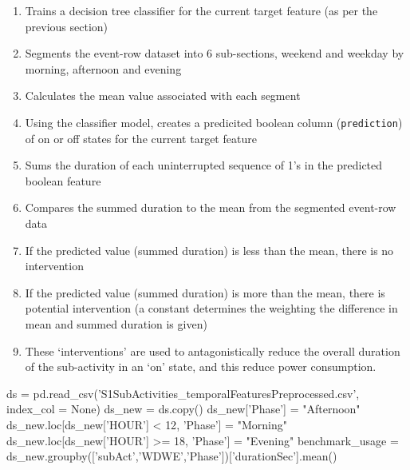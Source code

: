 \documentclass[11pt,]{article}
\newenvironment{Shaded}{\begin{snugshade}}{\end{snugshade}}
\newcommand{\DecValTok}[1]{\textcolor[rgb]{0.69,0.50,0.00}{#1}}
\newcommand{\NormalTok}[1]{\textcolor[rgb]{0.12,0.11,0.11}{#1}}
\newcommand{\OperatorTok}[1]{\textcolor[rgb]{0.12,0.11,0.11}{#1}}
\newcommand{\StringTok}[1]{\textcolor[rgb]{0.75,0.01,0.01}{#1}}
\newcommand{\VariableTok}[1]{\textcolor[rgb]{0.00,0.34,0.68}{#1}}
\providecommand{\tightlist}{%
  \setlength{\itemsep}{0pt}\setlength{\parskip}{0pt}}
\begin{document}
\begin{enumerate}
\def\labelenumi{\arabic{enumi}.}
\tightlist
\item
  Trains a decision tree classifier for the current target feature (as
  per the previous section)
\item
  Segments the event-row dataset into 6 sub-sections, weekend and
  weekday by morning, afternoon and evening
\item
  Calculates the mean value associated with each segment
\item
  Using the classifier model, creates a predicited boolean column
  (\texttt{prediction}) of on or off states for the current target
  feature
\item
  Sums the duration of each uninterrupted sequence of 1's in the
  predicted boolean feature
\item
  Compares the summed duration to the mean from the segmented event-row
  data
\item
  If the predicted value (summed duration) is less than the mean, there
  is no intervention
\item
  If the predicted value (summed duration) is more than the mean, there
  is potential intervention (a constant determines the weighting the
  difference in mean and summed duration is given)
\item
  These `interventions' are used to antagonistically reduce the overall
  duration of the sub-activity in an `on' state, and this reduce power
  consumption.
\end{enumerate}

\begin{Shaded}
\begin{Highlighting}[]
\NormalTok{ds }\OperatorTok{=}\NormalTok{ pd.read_csv(}\StringTok{'S1SubActivities_temporalFeaturesPreprocessed.csv'}\NormalTok{, index_col }\OperatorTok{=} \VariableTok{None}\NormalTok{) }
\NormalTok{ds_new }\OperatorTok{=}\NormalTok{ ds.copy()}
\NormalTok{ds_new[}\StringTok{'Phase'}\NormalTok{] }\OperatorTok{=} \StringTok{"Afternoon"}
\NormalTok{ds_new.loc[ds_new[}\StringTok{'HOUR'}\NormalTok{] }\OperatorTok{<} \DecValTok{12}\NormalTok{, }\StringTok{'Phase'}\NormalTok{] }\OperatorTok{=} \StringTok{"Morning"}
\NormalTok{ds_new.loc[ds_new[}\StringTok{'HOUR'}\NormalTok{] }\OperatorTok{>=} \DecValTok{18}\NormalTok{, }\StringTok{'Phase'}\NormalTok{] }\OperatorTok{=} \StringTok{"Evening"}
\NormalTok{benchmark_usage }\OperatorTok{=}\NormalTok{ ds_new.groupby([}\StringTok{'subAct'}\NormalTok{,}\StringTok{'WDWE'}\NormalTok{,}\StringTok{'Phase'}\NormalTok{])[}\StringTok{'durationSec'}\NormalTok{].mean()}
\end{Highlighting}
\end{Shaded}
\end{document}
